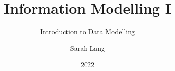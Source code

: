 

\title[Data Modelling] %
{Information Modelling I}
\subtitle{Introduction to Data Modelling}
\institute{%
}
\author[SL]{\hfill Sarah Lang}
\date[2022] %
{%
\hfill 2022%
}

\logo{%
}

\newcommand{\punkti}{~\lbrack\dots\rbrack~}

\renewenvironment{quote}
               {\list{\faQuoteLeft\phantom{ }}{\rightmargin\leftmargin}%
                \item\relax\footnotesize\ignorespaces}
               {\unskip\unskip\phantom{xx}\faQuoteRight\endlist}

\newcommand{\bgupper}[3]{\colorbox{#1}{\color{#2}\huge\bfseries\MakeUppercase{#3}}}
\newcommand{\bg}[3]{\colorbox{#1}{\bfseries\color{#2}#3}}

\newcommand{\mycommand}[2]{{\ttfamily\detokenize{#1}}~\dotfill{}~{ #2}\\} %

\newcommand{\sep}{{\scriptsize~\faCircle{ }~}}

\newcommand{\red}[1]{\bg{alert}{white}{#1}\\}
\newcommand{\green}[1]{\bg{w3schools}{white}{#1}\\}



\usepackage{xcolor}


\usepackage{tcolorbox}



